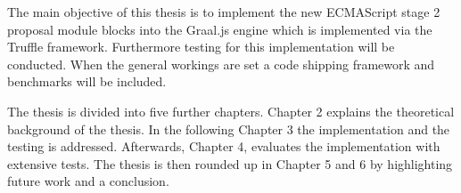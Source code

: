 The main objective of this thesis is to implement the new ECMAScript stage 2 proposal module blocks into the Graal.js engine which is implemented via the Truffle framework. Furthermore testing for this implementation will be conducted. When the general workings are set a code shipping framework and benchmarks will be included.

The thesis is divided into five further chapters. Chapter 2 explains the theoretical background of the thesis. In the following Chapter 3 the implementation and the testing is addressed. Afterwards, Chapter 4, evaluates the implementation with extensive tests. The thesis is then rounded up in Chapter 5 and 6 by highlighting future work and a conclusion.



